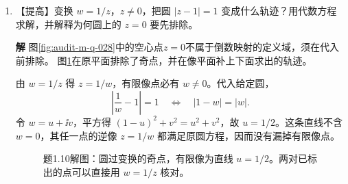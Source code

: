 \documentclass[11pt,openany,fontset=fandol]{ctexbook}
\theoremstyle{plain}\newtheorem{theorem}{定理}[chapter]\newtheorem{proposition}[theorem]{命题}
\theoremstyle{definition}\newtheorem{definition}{定义}[chapter]\newtheorem{example}{例}[chapter]
\theoremstyle{remark}\newtheorem*{remark}{说明}
\newcommand{\SolutionStart}{\par\nobreak\medskip\nobreak\noindent\textbf{解}\quad\ignorespaces}
\newenvironment{solution}{\SolutionStart}{\par\medskip}
\begin{document}
\begin{enumerate}[label=1.\arabic*]
\begin{solution}
当 $\kappa\ne1$，除以 $1-\kappa^2$，记
\[
x_0=\frac{d(1+\kappa^2)}{1-\kappa^2},
\]
配方得到 $(x-x_0)^2+y^2=x_0^2-d^2$。右侧整理为 $4d^2\kappa^2/(1-\kappa^2)^2$，所以圆心为 $(x_0,0)$，半径为 $2d\kappa/|1-\kappa^2|$。圆心坐标保留符号，半径必须为正。

因原式两侧非负，平方没有引入伪解。$\kappa\to1$ 时圆心和半径都变大，有限区域内的轨迹趋近直线，不能把两者分别当成有限极限。

当两距离相等时，图中动点在两定点的垂直平分线上；距离比改变后，圆心沿两定点所在实轴移动。
\end{solution}

\item \begin{minipage}[t]{\linewidth}
【提高】变换 $w=1/z$，$z\ne0$，把圆 $|z-1|=1$ 变成什么轨迹？用代数方程求解，并解释为何圆上的 $z=0$ 要先排除。

\end{minipage}

\begin{solution}
图\ref{fig:audit-m-q-028}中的空心点$z=0$不属于倒数映射的定义域，须在代入前排除。
图\ref{fig:ex-1-10}在原平面排除了奇点，并在像平面补上下面求出的轨迹。

由 $w=1/z$ 得 $z=1/w$，有限像点必有 $w\ne0$。代入给定圆，
\[
\left|\frac1w-1\right|=1
\quad\Longleftrightarrow\quad |1-w|=|w|.
\]
令 $w=u+\ii v$，平方得 $(1-u)^2+v^2=u^2+v^2$，故 $u=1/2$。这条直线不含 $w=0$，其任一点的逆像 $z=1/w$ 都满足原圆方程，因而没有漏掉有限像点。

\begin{figure}[H]\centering
{}
\caption{题1.10解图：圆过变换的奇点，有限像为直线 $u=1/2$。两对已标出的点可以直接用 $w=1/z$ 核对。}\label{fig:ex-1-10}
\end{figure}


\end{solution}
\end{enumerate}
\end{document}
